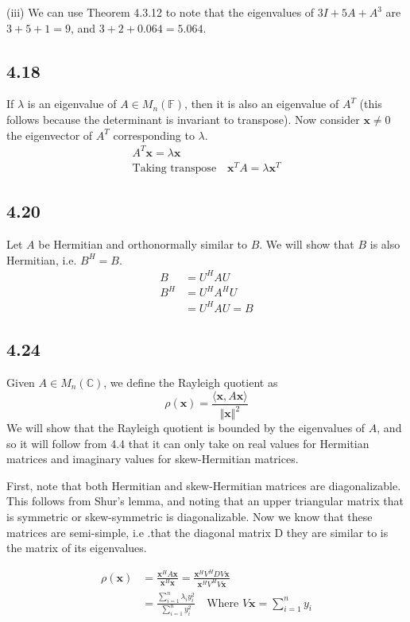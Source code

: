\documentclass{article}
\newcommand{\inprod}[1]{\langle #1 \rangle}
\begin{document}
	(iii) We can use Theorem 4.3.12 to note that the eigenvalues of $3I + 5A + A^3$ are $3 + 5 + 1 = 9$, and $3 + 2 + 0.064 = 5.064$. 
	
	\subsection*{4.18}
	If $\lambda$ is an eigenvalue of $A \in M_n(\mathbb{F})$, then it is also an eigenvalue of $A^T$ (this follows because the determinant is invariant to transpose). Now consider $\mathbf{x} \neq 0$ the eigenvector of $A^T$ corresponding to $\lambda$.
	\begin{align*}
	A^T \mathbf{x} = \lambda \mathbf{x} \\
	\text{Taking transpose} \quad
	\mathbf{x}^T A = \lambda \mathbf{x}^T
	\end{align*}
	
	\subsection*{4.20}
	Let $A$ be Hermitian and orthonormally similar to $B$. We will show that $B$ is also Hermitian, i.e. $B^H = B$.
	\begin{align*}
	B &= U^H A U \\
	B^H &= U^H A^H U \\
	&= U^H A U = B
	\end{align*}
	
	\subsection*{4.24}
	Given $A \in M_n(\mathbb{C})$, we define the Rayleigh quotient as
	\[ \rho(\mathbf{x}) = \frac{\inprod{\mathbf{x}, A \mathbf{x}}}{\Vert \mathbf{x} \Vert^2}\]
	We will show that the Rayleigh quotient is bounded by the eigenvalues of $A$, and so it will follow from 4.4 that it can only take on real values for Hermitian matrices and imaginary values for skew-Hermitian matrices. 
	
	First, note that both Hermitian and skew-Hermitian matrices are diagonalizable. This follows from Shur's lemma, and noting that an upper triangular matrix that is symmetric or skew-symmetric is diagonalizable. Now we know that these matrices are semi-simple, i.e .that the diagonal matrix D they are similar to is the matrix of its eigenvalues.
	
	\begin{align*}
	\rho(\mathbf{x}) &= \frac{\mathbf{x}^H A \mathbf{x}}{\mathbf{x}^H \mathbf{x}} = \frac{\mathbf{x}^H V^H D V \mathbf{x}}{\mathbf{x}^H V^H V \mathbf{x}} \\
	&= \frac{\sum_{i=1}^{n} \lambda_i y_i^2}{\sum_{i=1}^{n} y_i^2} \quad \text{Where } V \mathbf{x} = \sum_{i=1}^{n} y_i
	\end{align*}
	
\end{document}
